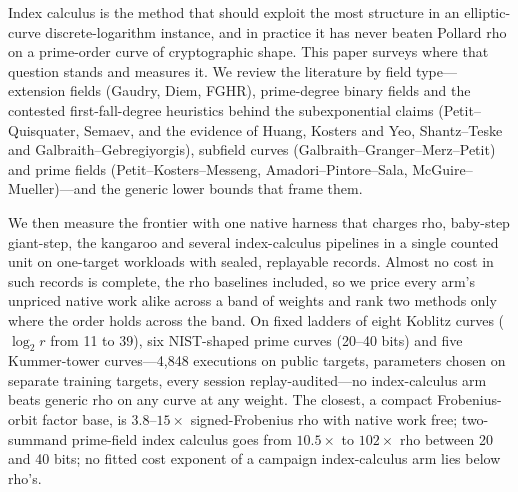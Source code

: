 Index calculus is the method that should exploit the most structure in an
elliptic-curve discrete-logarithm instance, and in practice it has never
beaten Pollard rho on a prime-order curve of cryptographic shape. This
paper surveys where that question stands and measures it. We review the
literature by field type---extension fields (Gaudry, Diem, FGHR), prime-degree
binary fields and the contested first-fall-degree heuristics behind the
subexponential claims (Petit--Quisquater, Semaev, and the evidence of Huang,
Kosters and Yeo, Shantz--Teske and Galbraith--Gebregiyorgis), subfield curves
(Galbraith--Granger--Merz--Petit) and prime fields (Petit--Kosters--Messeng,
Amadori--Pintore--Sala, McGuire--Mueller)---and the generic lower bounds that
frame them.

We then measure the frontier with one native harness that charges rho,
baby-step giant-step, the kangaroo and several index-calculus pipelines in a
single counted unit on one-target workloads with sealed, replayable records.
Almost no cost in such records is complete, the rho baselines included, so we
price every arm's unpriced native work alike across a band of weights and rank
two methods only where the order holds across the band. On fixed ladders of
eight Koblitz curves ($\log_2 r$ from 11 to 39), six NIST-shaped prime curves
(20--40 bits) and five Kummer-tower curves---4{,}848 executions on public
targets, parameters chosen on separate training targets, every session
replay-audited---no index-calculus arm beats generic rho on any curve at any
weight. The closest, a compact Frobenius-orbit factor base, is $3.8$--$15\times$
signed-Frobenius rho with native work free; two-summand prime-field index
calculus goes from $10.5\times$ to $102\times$ rho between 20 and 40 bits; no
fitted cost exponent of a campaign index-calculus arm lies below rho's.

